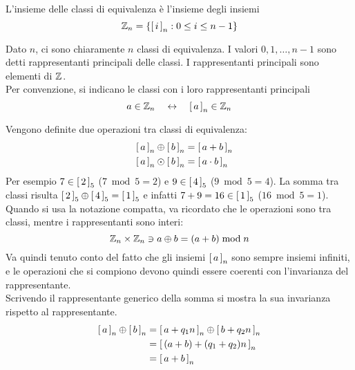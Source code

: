 \begin{definition}
    L'insieme delle classi di equivalenza è l'insieme degli insiemi
    \label{def:insieme_classi_equiv}
    \begin{equation*}
        \zz{n} =
        \left\{ 
            \cln{i}
            : 0 \leq i \leq n-1
        \right\}
    \end{equation*}
\end{definition}
Dato $n$, ci sono chiaramente $n$ classi di equivalenza.
I valori $0, 1, \dots, n-1$ sono detti rappresentanti principali delle classi.
I rappresentanti principali sono elementi di $\zz{}$.  
\\
Per convenzione, si indicano le classi con i loro rappresentanti principali 
\begin{equation*}
    a \in \zz{n}
    \quad
    \leftrightarrow
    \quad
    \cln{a} \in \zz{n}
\end{equation*}

Vengono definite due operazioni tra classi di equivalenza:
\begin{align*}
    \quad
    \cln{a} 
    \oplus
    \cln{b} 
    &
    =
    \cln{a + b}
    \\
    \quad
    \cln{a} 
    \odot
    \cln{b} 
    &
    =
    \cln{a \cdot b}
\end{align*}
Per esempio
$
7 \in \cleq{5}{2}
$ ($
    7 \bmod 5 = 2
$) e
$
9 \in \cleq{5}{4}
$ ($
    9 \bmod 5 = 4
$).
La somma tra classi risulta
$
\cleq{5}{2}
\oplus
\cleq{5}{4}
=
\cleq{5}{1}
$
e infatti
$
7 + 9 = 16 \in \cleq{5}{1}
$ ($
    16 \bmod 5 = 1
$).
\\
Quando si usa la notazione compatta, va ricordato che le operazioni sono tra classi, mentre i rappresentanti sono interi:
\begin{equation*}
    \zz{n} \times \zz{n} \ni
    a \oplus b = ( a + b ) \bmod n 
\end{equation*}
Va quindi tenuto conto del fatto che gli insiemi $\cln{a} $ sono sempre insiemi infiniti,
e le operazioni che si compiono devono quindi essere coerenti con l'invarianza del rappresentante.
\\
Scrivendo il rappresentante generico della somma si mostra la sua invarianza rispetto al rappresentante.
\begin{align*}
    \cln{a} 
    \oplus
    \cln{b} 
    &
    =
    \cln{a + q_1 n} 
    \oplus
    \cln{b + q_2 n} 
    \\
    &
    =
    \cln{ ( a + b ) + ( q_1 + q_2 ) n} 
    \\
    &
    =
    \cln{a + b}
\end{align*}

